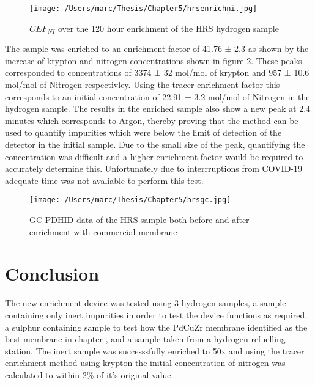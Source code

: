 \begin{landscape}
    \begin{figure}
        \centering
        \texttt{[image: /Users/marc/Thesis/Chapter5/hrsenrichni.jpg]}
        \caption{$CEF_{NI}$ over the 120 hour enrichment of the HRS hydrogen sample}
        \label{GCHRS}
    \end{figure}
\end{landscape}

The sample was enriched to an enrichment factor of 41.76 ± 2.3 as shown by the increase of krypton and nitrogen concentrations shown in figure \ref{HRSGCENRICH}. These peaks corresponded to concentrations of 3374 ± 32 \textmu mol/mol of krypton and 957 ± 10.6 \textmu mol/mol of Nitrogen respectivley. Using the tracer enrichment factor this corresponds to an initial concentration  of 22.91 ± 3.2  \textmu mol/mol of Nitrogen  in the hydrogen sample. The results in the enriched sample also show a new peak at 2.4 minutes which corresponds to Argon, thereby proving that the method can be used to quantify impurities which were below the limit of detection of the detector in the initial sample. Due to the small size of the peak, quantifying the concentration was difficult and a higher enrichment factor would be required to accurately determine this. Unfortunately due to interrruptions from COVID-19 adequate time was not avaliable to perform this test. 

\begin{figure}[H]
    \centering
    \texttt{[image: /Users/marc/Thesis/Chapter5/hrsgc.jpg]}
    \caption{GC-PDHID data of the HRS sample both before and after enrichment with commercial membrane}
    \label{HRSGCENRICH}
\end{figure}

\section{Conclusion}
The new enrichment device was tested using 3 hydrogen samples, a sample containing only inert impurities in order to test the device functions as required, a sulphur containing sample to test how the PdCuZr membrane identified as the best membrane in chapter \label{proc-testingchapref}, and a sample taken from a hydrogen refuelling station. The inert sample was successsfully enriched to 50x and using the tracer enrichment method using krypton the initial concentration of nitrogen was calculated to within 2\% of it's original value. 

